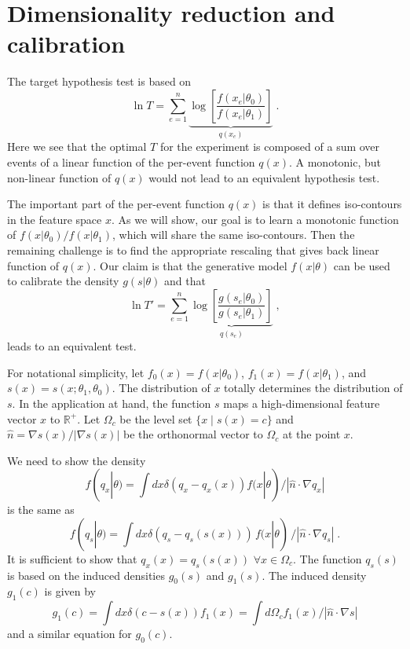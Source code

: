 \documentclass[11pt, oneside]{article}   	%
\begin{document}
\section{Dimensionality reduction and calibration}


 The target hypothesis test is based on 
\begin{equation}
\ln T =   \sum_{e=1}^n \underbrace{\log \left[ \frac {f(x_e | \theta_0) }{ f(x_e | \theta_1) } \right]}_{q(x_e)} \;.
\end{equation}
Here we see that the optimal $T$ for the experiment is composed of a sum over events of a  linear function of the per-event function $q(x)$. A monotonic, but non-linear function of $q(x)$ would not lead to an equivalent hypothesis test. 

The important part of the per-event function $q(x)$ is that it defines iso-contours in the feature space $x$. As we will show, our goal is to learn a monotonic function of $f(x|\theta_0)/f(x|\theta_1)$, which will share the same iso-contours. Then the remaining challenge is to find the appropriate rescaling that gives back  linear function of $q(x)$. Our claim is that the generative model $f(x|\theta)$ can be used to calibrate the density $g(s|\theta)$ and that
\begin{equation}
\ln T' = \sum_{e=1}^n \underbrace{\log \left[ \frac {g(s_e | \theta_0) }{ g(s_e | \theta_1) } \right]}_{q(s_e)} \;,
\end{equation}
leads to an equivalent test.

For notational simplicity, let $f_0(x) = f(x|\theta_0)$, $f_1(x) = f(x|\theta_1)$, and $s(x)=s(x; \theta_1, \theta_0)$.
The distribution of $x$ totally determines the distribution of $s$. 
In the application at hand, the function $s$ maps a high-dimensional feature vector $x$ to $\mathbb{R}^+$.
Let $\Omega_{c}$ be the level set $\{x \mid s(x) = c \}$ and $\hat{n}=\nabla s(x) / |\nabla s(x)|$ be the orthonormal vector to $\Omega_c$ at the point $x$.

We need to show the density
\begin{equation}
f(q_x|\theta) = \int dx \delta(q_x-q_x(x)) f(x|\theta)  / | \hat{n} \cdot \nabla q_x  | 
\end{equation}
is the same as
\begin{equation}
f(q_s|\theta) = \int dx \delta(q_s-q_s(s(x))) \, f(x|\theta) \, / | \hat{n} \cdot \nabla q_s  | \; .
\end{equation}
It is sufficient to show that $q_x(x) = q_s(s(x))$ $ \forall x\in\Omega_c$. The function $q_s(s)$ is based on the induced densities $g_0(s)$ and $g_1(s)$.  The induced density $g_1(c)$ is given by 
\begin{equation}
g_1(c) = \int dx \delta(c-s(x)) f_1(x) = \int d\Omega_c f_1(x)  / | \hat{n} \cdot \nabla s  |
\end{equation}
and a similar equation for $g_0(c)$. 
\end{document}
